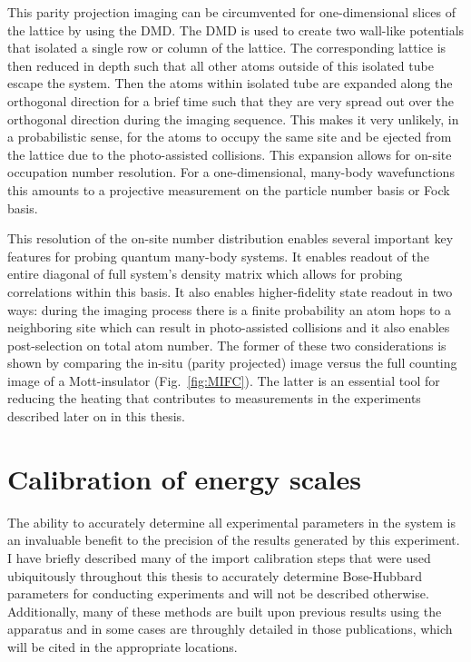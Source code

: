 This parity projection imaging can be circumvented for one-dimensional slices of the lattice by using the DMD. The DMD is used to create two wall-like potentials that isolated a single row or column of the lattice. The corresponding lattice is then reduced in depth such that all other atoms outside of this isolated tube escape the system. Then the atoms within isolated tube are expanded along the orthogonal direction for a brief time such that they are very spread out over the orthogonal direction during the imaging sequence. This makes it very unlikely, in a probabilistic sense, for the atoms to occupy the same site and be ejected from the lattice due to the photo-assisted collisions. This expansion allows for on-site occupation number resolution. For a one-dimensional, many-body wavefunctions this amounts to a projective measurement on the particle number basis or Fock basis. 

This resolution of the on-site number distribution enables several important key features for probing quantum many-body systems. It enables readout of the entire diagonal of full system's density matrix which allows for probing correlations within this basis. It also enables higher-fidelity state readout in two ways: during the imaging process there is a finite probability an atom hops to a neighboring site which can result in photo-assisted collisions and it also enables post-selection on total atom number. The former of these two considerations is shown by comparing the in-situ (parity projected) image versus the full counting image of a Mott-insulator (Fig.~\ref{fig:MIFC}). The latter is an essential tool for reducing the heating that contributes to measurements in the experiments described later on in this thesis.

\section{Calibration of energy scales}

The ability to accurately determine all experimental parameters in the system is an invaluable benefit to the precision of the results generated by this experiment. I have briefly described many of the import calibration steps that were used ubiquitously throughout this thesis to accurately determine Bose-Hubbard parameters for conducting experiments and will not be described otherwise. Additionally, many of these methods are built upon previous results using the apparatus and in some cases are throughly detailed in those publications, which will be cited in the appropriate locations.


